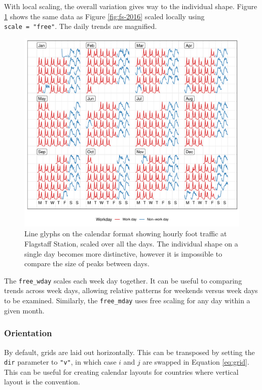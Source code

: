 \documentclass[12pt]{article}
\begin{document}
With local scaling, the overall variation gives way to the individual shape. Figure \ref{fig:fs-free} shows the same data as Figure \ref{fig:fs-2016} scaled locally using \texttt{scale\ =\ "free"}. The daily trends are magnified.

\begin{figure}

{\centering \includegraphics[width=\textwidth]{figure/fs-free-1} 

}

\caption{Line glyphs on the calendar format showing hourly foot traffic at Flagstaff Station, scaled over all the days. The individual shape on a single day becomes more distinctive, however it is impossible to compare the size of peaks between days.}\label{fig:fs-free}
\end{figure}



The \texttt{free\_wday} scales each week day together. It can be useful to comparing trends across week days, allowing relative patterns for weekends versus week days to be examined. Similarly, the \texttt{free\_mday} uses free scaling for any day within a given month.

\hypertarget{orientation}{%
\subsubsection{Orientation}\label{orientation}}

By default, grids are laid out horizontally. This can be transposed by setting the \texttt{dir} parameter to \texttt{"v"}, in which case \(i\) and \(j\) are swapped in Equation \eqref{eq:grid}. This can be useful for creating calendar layouts for countries where vertical layout is the convention.
\end{document}
